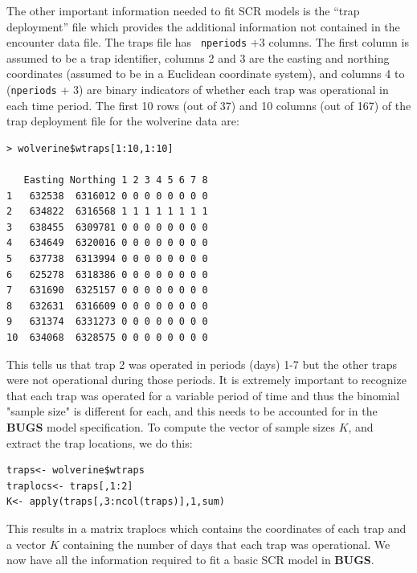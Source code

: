 The other important information needed to fit SCR models is the
``trap deployment'' file
which provides the additional information
not contained in the encounter data file. The traps file has \mbox{\tt
  nperiods} $+ 3$ columns. The first column is assumed to be a trap identifier,
columns 2 and 3 are the easting and northing coordinates (assumed to
be in a Euclidean coordinate system), and columns 4 to (\mbox{\tt nperiods} + 3)
are binary indicators of whether each trap was operational in each
time period. The first 10 rows (out of 37) and 10 columns (out of 167)
of the trap deployment file for the wolverine data are:
{\small
\begin{verbatim}
> wolverine$wtraps[1:10,1:10]

   Easting Northing 1 2 3 4 5 6 7 8 
1   632538  6316012 0 0 0 0 0 0 0 0
2   634822  6316568 1 1 1 1 1 1 1 1
3   638455  6309781 0 0 0 0 0 0 0 0
4   634649  6320016 0 0 0 0 0 0 0 0
5   637738  6313994 0 0 0 0 0 0 0 0
6   625278  6318386 0 0 0 0 0 0 0 0
7   631690  6325157 0 0 0 0 0 0 0 0
8   632631  6316609 0 0 0 0 0 0 0 0
9   631374  6331273 0 0 0 0 0 0 0 0
10  634068  6328575 0 0 0 0 0 0 0 0
\end{verbatim}
}
This tells us that trap 2 was operated in periods (days) 1-7 but the other
traps were not operational during those periods. It is extremely
important to recognize that each trap was operated for a variable
period of time and thus the binomial "sample size" is different for
each, and this needs to be accounted for in the {\bf BUGS} model specification.
To compute the vector of sample sizes $K$, and extract the trap
locations,  we do this:
\begin{verbatim}
traps<- wolverine$wtraps
traplocs<- traps[,1:2]
K<- apply(traps[,3:ncol(traps)],1,sum)
\end{verbatim}
This results in a matrix traplocs which contains the coordinates of
each trap and a vector $K$ containing the number of days that each trap
was operational. We now have all the information required to fit a
basic SCR model in {\bf BUGS}.


